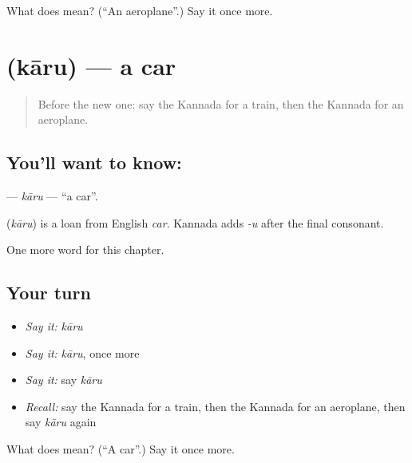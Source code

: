 \begin{tcolorbox}[breakable,colback=teal!4,colframe=teal!35!black,title={Before you move on}]
What does  mean? (\textquotedblleft{}An aeroplane\textquotedblright{}.) Say it once more.
\end{tcolorbox}
\section[\texorpdfstring{\kn{ಕಾರು} (kāru)}{ಕಾರು (kāru)}]{ (kāru) — a car}

\label{lesson:KA-C111-karu}



\begin{quote}
Before the new one: say the Kannada for a train, then the Kannada for an aeroplane.
\end{quote}

\subsection*{You'll want to know: }
\textbf{} — \emph{kāru} — \textquotedblleft{}a car\textquotedblright{}.

\begin{cousinweb}
\textbf{} (\emph{kāru}) is a loan from English \emph{car}. Kannada adds \emph{-u} after the final consonant.
\end{cousinweb}

\begin{grammarlens}[title={What you've built}]
One more word for this chapter.
\end{grammarlens}

\subsection*{Your turn}
\begin{itemize}
\raggedright
  \item \emph{Say it:} \emph{kāru}
  \item \emph{Say it:} \emph{kāru}, once more
  \item \emph{Say it:} say \emph{kāru}
  \item \emph{Recall:} say the Kannada for a train, then the Kannada for an aeroplane, then say \emph{kāru} again
\end{itemize}

\begin{tcolorbox}[breakable,colback=teal!4,colframe=teal!35!black,title={Before you move on}]
What does  mean? (\textquotedblleft{}A car\textquotedblright{}.) Say it once more.
\end{tcolorbox}
